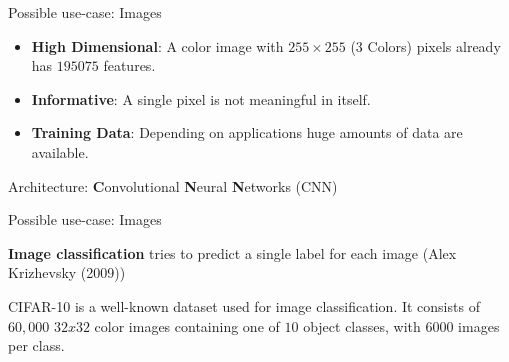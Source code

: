 \begin{frame} {Possible use-case: Images}

\begin{itemize}
\item \textbf{High Dimensional}: A color image with $255 \times 255$ (3 Colors) pixels already has $195075$ features.
\vspace{.5cm}
\item \textbf{Informative}: A single pixel is not meaningful in itself.
\vspace{.5cm}
\item \textbf{Training Data}: Depending on applications huge amounts of data are available.
\end{itemize}
\vspace{1.5cm}
Architecture: \textbf{C}onvolutional \textbf{N}eural \textbf{N}etworks (CNN)
\end{frame}


\begin{frame} {Possible use-case: Images}

\begin{figure}
\centering
{}
\end{figure}

\textbf{Image classification} tries to predict a single label for each image (Alex Krizhevsky (2009))

CIFAR-10 is a well-known dataset used for image classification. It consists of $60,000$ $32x32$ color images containing one of $10$ object classes, with $6000$ images per class. 

\end{frame}

